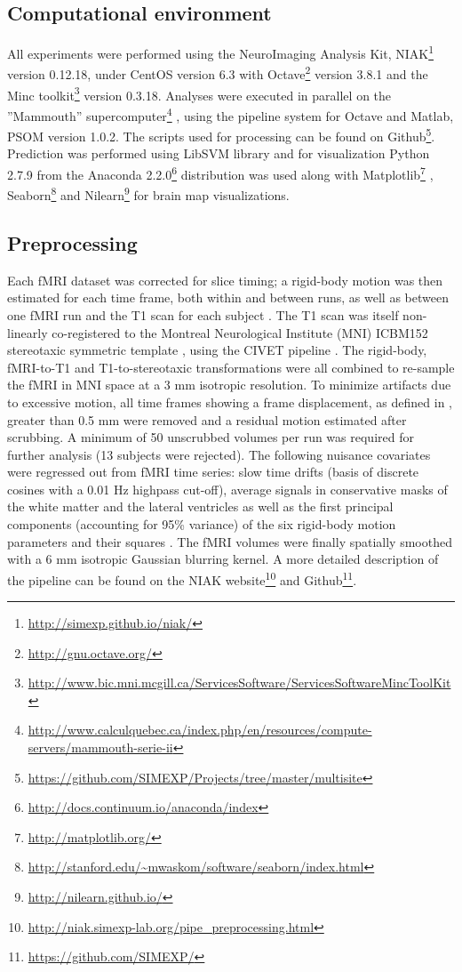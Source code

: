 \documentclass[authoryear]{elsarticle}
\begin{document}
\subsection{Computational environment}
All experiments were performed using the NeuroImaging Analysis Kit, NIAK\footnote{\url{http://simexp.github.io/niak/}} \citep{Bellec2011} version 0.12.18, under CentOS version 6.3 with Octave\footnote{\url{http://gnu.octave.org/}} version 3.8.1 and the Minc toolkit\footnote{\url{http://www.bic.mni.mcgill.ca/ServicesSoftware/ServicesSoftwareMincToolKit}} version 0.3.18. Analyses were executed in parallel on the ”Mammouth” supercomputer\footnote{\url{http://www.calculquebec.ca/index.php/en/resources/compute-servers/mammouth-serie-ii}} , using the pipeline system for Octave and Matlab, PSOM \citep{Bellec2012} version 1.0.2. The scripts used for processing can be found on Github\footnote{\url{https://github.com/SIMEXP/Projects/tree/master/multisite}}. Prediction was performed using LibSVM library \citep{Chang2011} and for visualization Python 2.7.9 from the Anaconda 2.2.0\footnote{\url{http://docs.continuum.io/anaconda/index}} distribution was used along with Matplotlib\footnote{\url{http://matplotlib.org/}} \citep{matplotlib}, Seaborn\footnote{\url{http://stanford.edu/~mwaskom/software/seaborn/index.html}} and Nilearn\footnote{\url{http://nilearn.github.io/}} for brain map visualizations.

\subsection{Preprocessing}
Each fMRI dataset was corrected for slice timing; a rigid-body motion was then estimated for each time frame, both within and between runs, as well as between one fMRI run and the T1 scan for each subject \citep{Collins1994}. The T1 scan was itself non-linearly co-registered to the Montreal Neurological Institute (MNI) ICBM152 stereotaxic symmetric template \citep{Fonov2011}, using the CIVET pipeline \citep{Ad-Dab'bagh2006}. The rigid-body, fMRI-to-T1 and T1-to-stereotaxic transformations were all combined to re-sample the fMRI in MNI space at a 3 mm isotropic resolution. To minimize artifacts due to excessive motion, all time frames showing a frame displacement, as defined in \cite{Power2012}, greater than 0.5 mm were removed and a residual motion estimated after scrubbing. A minimum of 50 unscrubbed volumes per run was required for further analysis (13 subjects were rejected). The following nuisance covariates were regressed out from fMRI time series: slow time drifts (basis of discrete cosines with a 0.01 Hz highpass cut-off), average signals in conservative masks of the white matter and the lateral ventricles as well as the first principal components (accounting for 95\% variance) of the six rigid-body motion parameters and their squares \citep{Giove2009,Lund2006}. The fMRI volumes were finally spatially smoothed with a 6 mm isotropic Gaussian blurring kernel. A more detailed description of the pipeline can be found on the NIAK website\footnote{\url{http://niak.simexp-lab.org/pipe_preprocessing.html}} and Github\footnote{\url{https://github.com/SIMEXP/}}.
\end{document}
